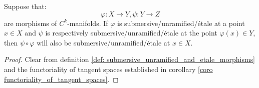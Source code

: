         \begin{lemma} \label{lemma: compositions_of_submersive_unramified_and_etale_morphisms}
            Suppose that:
                $$\varphi: X \to Y, \psi: Y \to Z$$
            are morphisms of $C^k$-manifolds. If $\varphi$ is submersive/unramified/\'etale at a point $x \in X$ and $\psi$ is respectively submersive/unramified/\'etale at the point $\varphi(x) \in Y$, then $\psi \circ \varphi$ will also be submersive/unramified/\'etale at $x \in X$.
        \end{lemma}
            \begin{proof}
                Clear from definition \ref{def: submersive_unramified_and_etale_morphisms} and the functoriality of tangent spaces established in corollary \ref{coro functoriality_of_tangent_spaces}.
            \end{proof}

